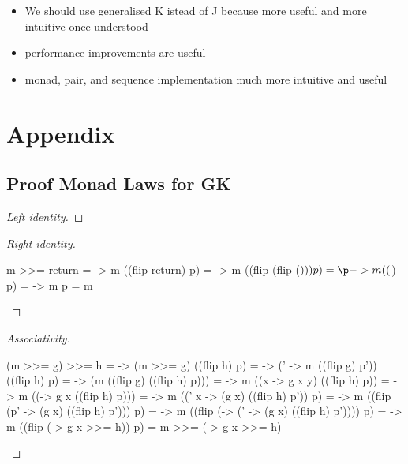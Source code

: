 \documentclass[runningheads]{llncs}
\providecommand{\tightlist}{%
  \setlength{\itemsep}{0pt}\setlength{\parskip}{0pt}}
\begin{document}
\begin{itemize}
\tightlist
\item
  We should use generalised K istead of J because more useful and more
  intuitive once understood
\item
  performance improvements are useful
\item
  monad, pair, and sequence implementation much more intuitive and
  useful
\end{itemize}

%
%
%
% 
% 
%



\newpage
\section*{Appendix}
\appendix
\subsection*{Proof Monad Laws for GK}\label{GK-monad-laws}
\begin{proof}[Left identity]
\end{proof}
\begin{proof}[Right identity]
\begin{haskell}
m >>= return
= \p -> m ((flip return) p)
= \p -> m ((flip (flip ($))) p)
= \p -> m (($) p)
= \p -> m p
= m
\end{haskell}
\end{proof}
\begin{proof}[Associativity]
\begin{haskell}
(m >>= g) >>= h
= \p -> (m >>= g) ((flip h) p)
= \p -> (\p' -> m ((flip g) p')) ((flip h) p)
= \p -> (m ((flip g) ((flip h) p)))
= \p -> m ((\y x -> g x y) ((flip h) p))
= \p -> m ((\x -> g x ((flip h) p)))
= \p -> m ((\p' x -> (g x) ((flip h) p')) p)
= \p -> m ((flip (\x p' -> (g x) ((flip h) p'))) p)
= \p -> m ((flip (\x -> (\p' -> (g x) ((flip h) p')))) p)
= \p -> m ((flip (\x -> g x >>= h)) p)
= m >>= (\x -> g x >>= h)
\end{haskell}
\end{proof}
\end{document}
